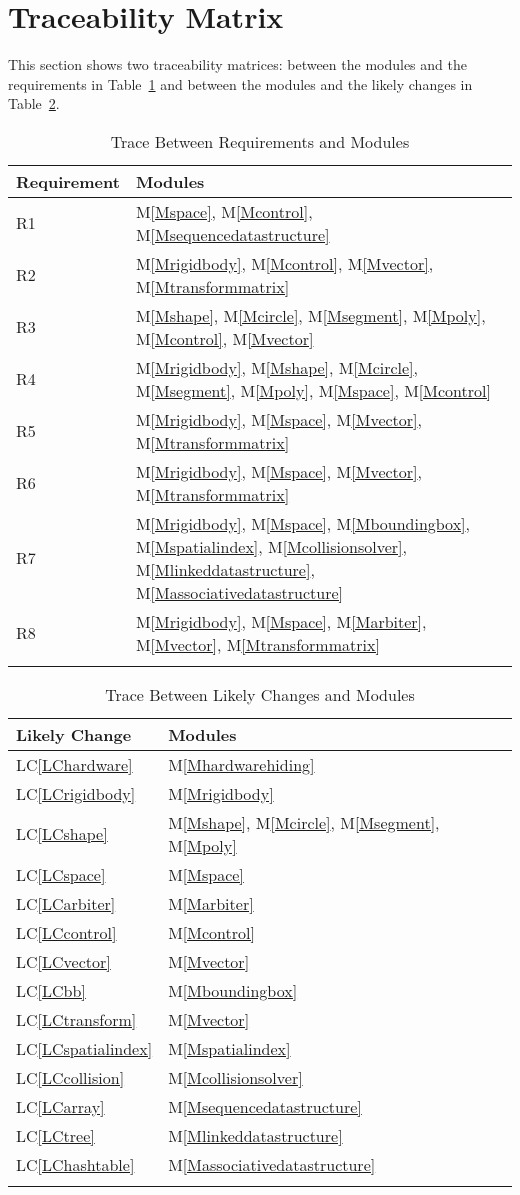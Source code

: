 \documentclass[12pt]{article}
\begin{document}
\section{Traceability Matrix}
\label{Sec:TM}
This section shows two traceability matrices: between the modules and the requirements in Table~\ref{Table:TBRaM} and between the modules and the likely changes in Table~\ref{Table:TBLCaM}.
\begin{longtable}{l l}
\toprule
Requirement & Modules
\\
\midrule
R1 & M\ref{Mspace}, M\ref{Mcontrol}, M\ref{Msequencedatastructure}
\\
R2 & M\ref{Mrigidbody}, M\ref{Mcontrol}, M\ref{Mvector}, M\ref{Mtransformmatrix}
\\
R3 & M\ref{Mshape}, M\ref{Mcircle}, M\ref{Msegment}, M\ref{Mpoly}, M\ref{Mcontrol}, M\ref{Mvector}
\\
R4 & M\ref{Mrigidbody}, M\ref{Mshape}, M\ref{Mcircle}, M\ref{Msegment}, M\ref{Mpoly}, M\ref{Mspace}, M\ref{Mcontrol}
\\
R5 & M\ref{Mrigidbody}, M\ref{Mspace}, M\ref{Mvector}, M\ref{Mtransformmatrix}
\\
R6 & M\ref{Mrigidbody}, M\ref{Mspace}, M\ref{Mvector}, M\ref{Mtransformmatrix}
\\
R7 & M\ref{Mrigidbody}, M\ref{Mspace}, M\ref{Mboundingbox}, M\ref{Mspatialindex}, M\ref{Mcollisionsolver}, M\ref{Mlinkeddatastructure}, M\ref{Massociativedatastructure}
\\
R8 & M\ref{Mrigidbody}, M\ref{Mspace}, M\ref{Marbiter}, M\ref{Mvector}, M\ref{Mtransformmatrix}
\\
\bottomrule
\caption{Trace Between Requirements and Modules}
\label{Table:TBRaM}
\end{longtable}
\begin{longtable}{l l}
\toprule
Likely Change & Modules
\\
\midrule
LC\ref{LChardware} & M\ref{Mhardwarehiding}
\\
LC\ref{LCrigidbody} & M\ref{Mrigidbody}
\\
LC\ref{LCshape} & M\ref{Mshape}, M\ref{Mcircle}, M\ref{Msegment}, M\ref{Mpoly}
\\
LC\ref{LCspace} & M\ref{Mspace}
\\
LC\ref{LCarbiter} & M\ref{Marbiter}
\\
LC\ref{LCcontrol} & M\ref{Mcontrol}
\\
LC\ref{LCvector} & M\ref{Mvector}
\\
LC\ref{LCbb} & M\ref{Mboundingbox}
\\
LC\ref{LCtransform} & M\ref{Mvector}
\\
LC\ref{LCspatialindex} & M\ref{Mspatialindex}
\\
LC\ref{LCcollision} & M\ref{Mcollisionsolver}
\\
LC\ref{LCarray} & M\ref{Msequencedatastructure}
\\
LC\ref{LCtree} & M\ref{Mlinkeddatastructure}
\\
LC\ref{LChashtable} & M\ref{Massociativedatastructure}
\\
\bottomrule
\caption{Trace Between Likely Changes and Modules}
\label{Table:TBLCaM}
\end{longtable}
\end{document}
